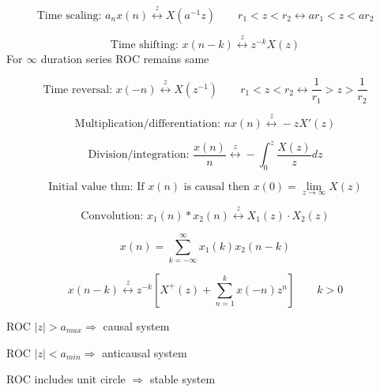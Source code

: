 \documentclass[a4paper]{article}
\begin{document}
\begin{displaymath}
\textrm{Time scaling:  }
a_nx(n)
\stackrel{z}{\longleftrightarrow}
X(a^{-1}z)
\qquad
r_1<z<r_2\longleftrightarrow ar_1<z<ar_2
\end{displaymath}

\begin{displaymath}
\textrm{Time shifting: }
x(n-k)
\stackrel{z}{\longleftrightarrow}
z^{-k}X(z)
\end{displaymath}
For $\infty$ duration series ROC remains same

\begin{displaymath}
\textrm{Time reversal: }
x(-n)
\stackrel{z}{\longleftrightarrow}
X(z^{-1})
\qquad
r_1<z<r_2\leftrightarrow \frac{1}{r_1}>z>\frac{1}{r_2}
\end{displaymath}

\begin{displaymath}
\textrm{Multiplication/differentiation: }
nx(n)
\stackrel{z}{\longleftrightarrow}
-zX'(z)
\end{displaymath}

\begin{displaymath}
\textrm{Division/integration: }
\frac{x(n)}{n}
\stackrel{z}{\longleftrightarrow}
-\int_0^z \frac{X(z)}{z}dz
\end{displaymath}

\begin{displaymath}
\textrm{Initial value thm: If $x(n)$ is causal then }
x(0)=\lim_{z\rightarrow \infty} X(z)
\end{displaymath}


\begin{displaymath}
\textrm{Convolution: }
x_1(n) * x_2(n)
\stackrel{z}{\longleftrightarrow}
X_1(z)\cdot X_2(z)
\end{displaymath}

\begin{displaymath}
x(n)=\sum_{k=-\infty}^{\infty} x_1(k)x_2(n-k)
\end{displaymath}

\begin{displaymath}
x(n-k) \stackrel{z}{\longleftrightarrow} 
z^{-k}[X^+(z) + 
\sum_{n=1}^{k} x(-n)z^n ]
\qquad k>0
\end{displaymath}

ROC $|z|>a_{max} \Rightarrow$ causal system

ROC $|z|<a_{min} \Rightarrow$ anticausal system

ROC includes unit circle $\Rightarrow$ stable system
\end{document}
